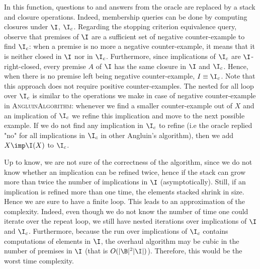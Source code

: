 \noindent In this function, questions to and answers from the oracle are replaced by a stack and closure operations. Indeed, membership queries can
be done by computing closures under $\I$, $\I_c$. Regarding the stopping 
criterion equivalence query, observe that premises of $\I$ are a sufficient set of negative counter-example to find $\I_c$: when a premise is no more a negative counter-example, it means that it is neither closed in $\I$ nor in 
$\I_c$. Furthermore, since implications of $\I_c$ are $\I$-right-closed, every
premise $A$ of $\I$ has the same closure in $\I$ and $\I_c$. Hence, when there
is no premise left being negative counter-example, $I \equiv \I_c$. Note that this approach does not require positive counter-examples. The nested for all loop over $\I_c$ is similar to the operations we make in case of negative counter-example in \textsc{AngluinAlgorithm}: whenever we find a smaller counter-example out of $X$ and an implication of $\I_c$ we refine this implication and move to the next possible example. If we do not find any implication in $\I_c$ to refine (i.e the oracle replied "no" for all implications in $\I_c$ in other Angluin's algorithm), then we add $X \imp \I(X)$ to $\I_c$. 

\vspace{1.2em}

Up to know, we are not sure of the correctness of the algorithm, since we do
not know whether an implication can be refined twice, hence if the stack can
grow more than twice the number of implications in $\I$ (asymptotically). Still, if an implication is refined more than one time, the elements stacked shrink in size. Hence we are sure to have a finite loop. This leads to an approximation of the complexity. Indeed, even though we do not know the number of time one could iterate over the repeat loop, we still have nested
iterations over implications of $\I$ and $\I_c$. Furthermore, because the run
over implications of $\I_c$ contains computations of elements in $\I$, the 
overhaul algorithm may be cubic in the number of premises in $\I$ (that is $O(|\B|^2|\I|)$). Therefore, this would be the worst time complexity.

\vspace{1.2em}


